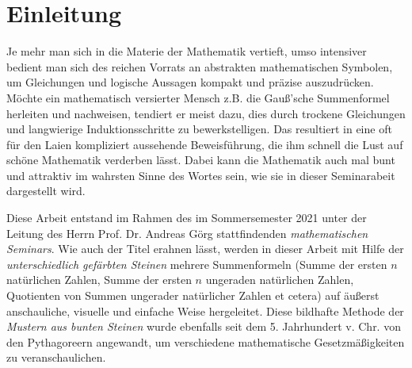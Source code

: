 %
%

\chapter{Einleitung}



Je mehr man sich in die Materie der Mathematik vertieft,
umso intensiver bedient man sich des reichen Vorrats an
abstrakten mathematischen Symbolen, um Gleichungen und
logische Aussagen kompakt und präzise
auszudrücken.
Möchte ein mathematisch versierter Mensch z.B. die
Gauß'sche Summenformel herleiten und nachweisen,
tendiert er meist dazu, dies durch trockene Gleichungen
und langwierige Induktionsschritte zu bewerkstelligen.
Das resultiert in eine oft für den Laien kompliziert
aussehende Beweisführung, die ihm schnell die Lust
auf schöne Mathematik verderben lässt.
Dabei kann die Mathematik auch mal bunt und attraktiv
im wahrsten Sinne des Wortes sein, wie sie in dieser
Seminarabeit dargestellt wird.

Diese Arbeit entstand im Rahmen des im Sommersemester
2021 unter der Leitung des Herrn Prof. Dr. Andreas Görg stattfindenden \textit{mathematischen Seminars}.
Wie auch der Titel erahnen lässt, werden
in dieser Arbeit
mit Hilfe der
\textit{unterschiedlich gefärbten Steinen}
mehrere Summenformeln
(Summe der ersten $n$ natürlichen Zahlen,
Summe der ersten $n$ ungeraden natürlichen Zahlen,
Quotienten von Summen ungerader natürlicher Zahlen
et cetera)
auf äußerst anschauliche, visuelle und einfache
Weise hergeleitet.
Diese bildhafte Methode der
\textit{Mustern aus bunten Steinen}
wurde ebenfalls seit dem 5. Jahrhundert v. Chr.
von den Pythagoreern angewandt, um verschiedene
mathematische Gesetzmäßigkeiten zu
veranschaulichen.
